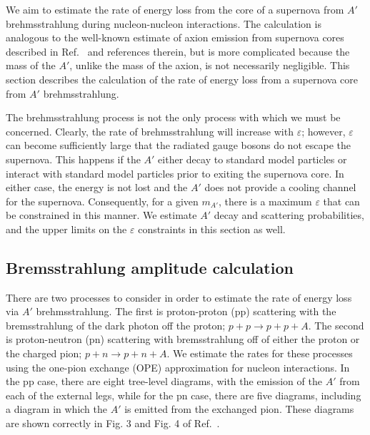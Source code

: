 \documentclass[nofootinbib,prd,superscriptaddress,twocolumn]{revtex4}
\begin{document}
We aim to estimate the rate of energy loss from the core of a supernova from $A'$ brehmsstrahlung 
during nucleon-nucleon interactions. The calculation is analogous to the well-known estimate of axion 
emission from supernova cores described in Ref.~\cite{raffelt96_book} and references therein, but is 
more complicated because the mass of the $A'$, unlike the mass of the axion, is not necessarily 
negligible. This section describes the calculation of the rate of energy loss from a supernova core 
from $A'$ brehmsstrahlung. 

The brehmsstrahlung process is not the only process with which we must be concerned. Clearly, the rate of 
brehmsstrahlung will increase with $\varepsilon$; however, $\varepsilon$ can become sufficiently large 
that the radiated gauge bosons do not escape the supernova. This happens if the $A'$ either decay to 
standard model particles or interact with standard model particles prior to exiting the supernova core. 
In either case, the energy is not lost and the $A'$ does not provide a cooling channel for the supernova. 
Consequently, for a given $m_{A'}$, there is a maximum $\varepsilon$ that can be constrained in this 
manner. We estimate $A'$ decay and scattering probabilities, and the upper limits on the $\varepsilon$ 
constraints in this section as well. 

	
\subsection{Bremsstrahlung amplitude calculation}


There are two processes to consider in order to estimate the rate of energy loss via $A'$ brehmsstrahlung. The first is  
proton-proton (pp) scattering with the bremsstrahlung of the dark photon off the proton; $p+p \rightarrow p+p+A$. The 
second is proton-neutron (pn) scattering with bremsstrahlung off of either the proton or the charged pion; 
$p+n \rightarrow p+n+A$. We estimate the rates for these processes using the one-pion exchange (OPE) 
approximation for nucleon interactions. In the pp case, there are eight tree-level diagrams, 
with the emission of the $A'$ from each of the external legs, while for the pn case, there are five diagrams, 
including a diagram in which the $A'$ is emitted from the exchanged pion. These diagrams are shown 
correctly in Fig. 3 and Fig. 4 of Ref.~\cite{dent_etal12}.
	
\end{document}
